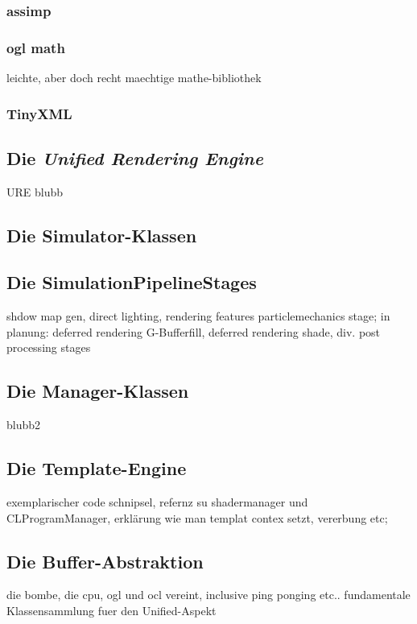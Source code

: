     \subsubsection{assimp}
    \subsubsection{ogl math}
    	leichte, aber doch recht maechtige mathe-bibliothek
    \subsubsection{TinyXML}
    	
    	
\subsection{Die \emph{Unified Rendering Engine}}
URE blubb

\subsection{Die Simulator-Klassen}

\subsection{Die SimulationPipelineStages}
	shdow map gen, direct lighting, rendering features particlemechanics stage;
	in planung: deferred rendering G-Bufferfill, deferred rendering shade, div. post processing stages

\subsection{Die Manager-Klassen}
blubb2

\subsection{Die Template-Engine}
	\label{sec:architecture:templateEngine}
	exemplarischer code schnipsel, refernz su shadermanager und CLProgramManager, erklärung wie man templat contex setzt, 	
	vererbung etc;
    	
\subsection{Die Buffer-Abstraktion}   	
 	die bombe, die cpu, ogl und ocl vereint, inclusive ping ponging etc.. fundamentale Klassensammlung fuer den Unified-Aspekt
 
